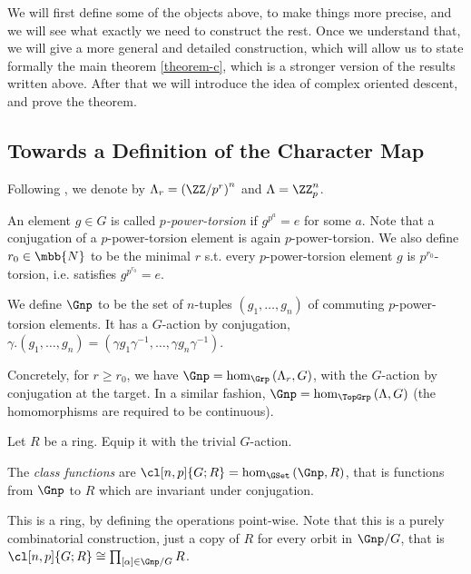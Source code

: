 We will first define some of the objects above, to make things more precise, and we will see what exactly we need to construct the rest.
Once we understand that, we will give a more general and detailed construction, which will allow us to state formally the main theorem \ref{theorem-c}, which is a stronger version of the results written above.
After that we will introduce the idea of complex oriented descent, and prove the theorem.



\subsection{Towards a Definition of the Character Map}\label{towards-character-map}

Following \cite{HKR}, we denote by $\Lambda_r = \left(\ZZ/{p^r}\right)^n$ and $\Lambda = \ZZ_p^n$.

An element $g \in G$ is called \emph{$p$-power-torsion} if $g^{p^a} = e$ for some $a$.
Note that a conjugation of a $p$-power-torsion element is again $p$-power-torsion.
We also define $r_0 \in \mbb{N}$ to be the minimal $r$ s.t. every $p$-power-torsion element $g$ is $p^{r_0}$-torsion, i.e. satisfies $g^{p^{r_0}} = e$.

\begin{definition}
	We define $\Gnp$ to be the set of $n$-tuples $\left(g_1, \dotsc, g_n\right)$ of commuting $p$-power-torsion elements.
	It has a $G$-action by conjugation, $\gamma. \left(g_1, \dotsc, g_n\right) = \left(\gamma g_1 \gamma^{-1}, \dotsc, \gamma g_n \gamma^{-1}\right)$.
\end{definition}

Concretely, for $r \geq r_0$, we have $\Gnp = \hom_{\Grp}\left(\Lambda_r, G\right)$, with the $G$-action by conjugation at the target.
In a similar fashion, $\Gnp = \hom_{\TopGrp}\left(\Lambda, G\right)$ (the homomorphisms are required to be continuous).

Let $R$ be a ring.
Equip it with the trivial $G$-action.

\begin{definition}\label{class-function-*}
	The \emph{class functions} are $\cl[n,p]{G; R} = \hom_{\GSet}\left(\Gnp, R\right)$, that is functions from $\Gnp$ to $R$ which are invariant under conjugation.
\end{definition}

This is a ring, by defining the operations point-wise.
Note that this is a purely combinatorial construction, just a copy of $R$ for every orbit in $\Gnp/G$, that is $\cl[n,p]{G; R} \cong \prod_{\left[\alpha\right] \in \Gnp/G} R$.

